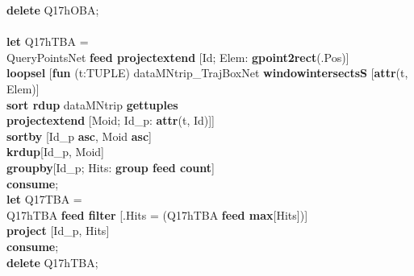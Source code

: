\documentclass[a4paper]{article}
\newcommand{\op}[1]{\textbf{#1}}
\begin{document}
\begin{scriptsize}
\begin{tabbing}
\op{delete} Q17hOBA;\\
\\
\op{let} Q17hTBA =\\
\>QueryPointsNet \op{feed projectextend} [Id; Elem: \op{gpoint2rect}(.Pos)]\\
\>\op{loopsel} [\op{fun} (t:TUPLE) dataMNtrip\_TrajBoxNet \op{windowintersectsS} [\op{attr}(t, Elem)]\\
\>\>\op{sort rdup} dataMNtrip \op{gettuples}\\
\>\>\op{projectextend} [Moid; Id\_p: \op{attr}(t, Id)]]\\
\>\op{sortby} [Id\_p \op{asc}, Moid \op{asc}]\\
\>\op{krdup}[Id\_p, Moid]\\
\>\op{groupby}[Id\_p; Hits: \op{group feed count}]\\
\op{consume};\\
\op{let} Q17TBA =\\
\>Q17hTBA \op{feed filter} [.Hits = (Q17hTBA \op{feed max}[Hits])]\\
\>\op{project} [Id\_p, Hits]\\
\op{consume};\\
\op{delete} Q17hTBA;\\
\end{tabbing}
\end{scriptsize}
\end{document}
